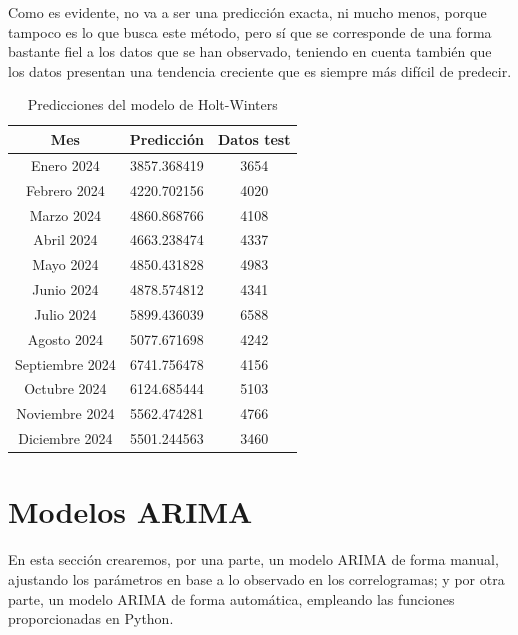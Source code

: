 \documentclass[a4paper,onecolumn]{extarticle}
\let\stdsection\section
\renewcommand\section{\newpage\stdsection}
\begin{document}
\begin{sloppypar}
Como es evidente, no va a ser una predicción exacta, ni mucho menos, porque tampoco es lo que busca 
este método, pero sí que se corresponde de una forma bastante fiel a los datos que se han observado, teniendo en cuenta también que los datos presentan una 
tendencia creciente que es siempre más difícil de predecir. 
\begin{table}[h!]
    \begin{center}
        \begin{tabular}{|c|c|c|}
            \hline
            \textbf{Mes} & \textbf{Predicción} & \textbf{Datos test} \\
            \hline
            Enero 2024         & 3857.368419 & 3654 \\
            Febrero 2024       & 4220.702156 & 4020 \\
            Marzo 2024         & 4860.868766 & 4108 \\
            Abril 2024         & 4663.238474 & 4337 \\
            Mayo 2024          & 4850.431828 & 4983 \\
            Junio 2024         & 4878.574812 & 4341 \\
            Julio 2024         & 5899.436039 & 6588 \\
            Agosto 2024        & 5077.671698 & 4242 \\
            Septiembre 2024    & 6741.756478 & 4156 \\
            Octubre 2024       & 6124.685444 & 5103 \\
            Noviembre 2024     & 5562.474281 & 4766 \\
            Diciembre 2024     & 5501.244563 & 3460 \\
            \hline
        \end{tabular}
        \caption{Predicciones del modelo de Holt-Winters}
        \label{tab:prediccionesHoltWinter}
    \end{center}
\end{table}

\section{Modelos ARIMA}
En esta sección crearemos, por una parte, un modelo ARIMA de forma manual, ajustando los parámetros en base a lo observado en los correlogramas; y por otra 
parte, un modelo ARIMA de forma automática, empleando las funciones proporcionadas en Python.


\end{sloppypar}
\end{document}
